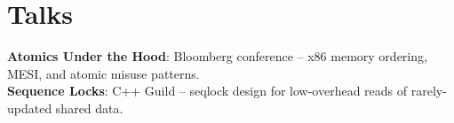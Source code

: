 \section{Talks}
 \begin{itemize}[leftmargin=0.15in, label={}]
    \small{\item{
     \textbf{Atomics Under the Hood}{: Bloomberg conference -- x86 memory ordering, MESI, and atomic misuse patterns.} \\
     \textbf{Sequence Locks}{: C++ Guild -- seqlock design for low-overhead reads of rarely-updated shared data.}
    }}
 \end{itemize}
